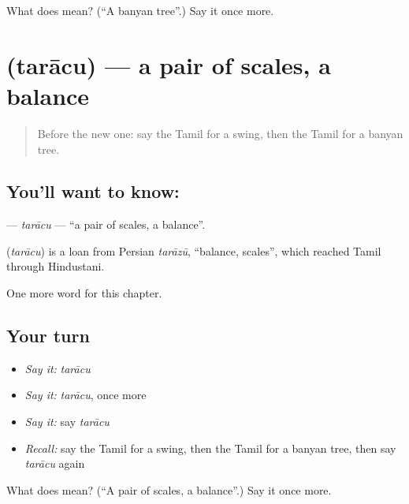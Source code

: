 \begin{tcolorbox}[breakable,colback=teal!4,colframe=teal!35!black,title={Before you move on}]
What does  mean? (\textquotedblleft{}A banyan tree\textquotedblright{}.) Say it once more.
\end{tcolorbox}
\section[\texorpdfstring{\ta{தராசு} (tarācu)}{தராசு (tarācu)}]{ (tarācu) — a pair of scales, a balance}

\label{lesson:TA-C250-taracu}



\begin{quote}
Before the new one: say the Tamil for a swing, then the Tamil for a banyan tree.
\end{quote}

\subsection*{You'll want to know: }
\textbf{} — \emph{tarācu} — \textquotedblleft{}a pair of scales, a balance\textquotedblright{}.

\begin{cousinweb}
\textbf{} (\emph{tarācu}) is a loan from Persian \emph{tarāzū}, \textquotedblleft{}balance, scales\textquotedblright{}, which reached Tamil through Hindustani.
\end{cousinweb}

\begin{grammarlens}[title={What you've built}]
One more word for this chapter.
\end{grammarlens}

\subsection*{Your turn}
\begin{itemize}
\raggedright
  \item \emph{Say it:} \emph{tarācu}
  \item \emph{Say it:} \emph{tarācu}, once more
  \item \emph{Say it:} say \emph{tarācu}
  \item \emph{Recall:} say the Tamil for a swing, then the Tamil for a banyan tree, then say \emph{tarācu} again
\end{itemize}

\begin{tcolorbox}[breakable,colback=teal!4,colframe=teal!35!black,title={Before you move on}]
What does  mean? (\textquotedblleft{}A pair of scales, a balance\textquotedblright{}.) Say it once more.
\end{tcolorbox}

